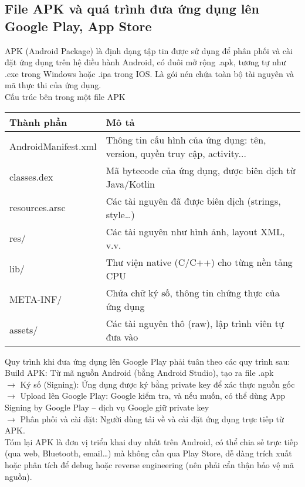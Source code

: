     \subsection{File APK và quá trình đưa ứng dụng lên Google Play, App Store}
    \renewcommand{\labelitemi}{--}
    \begin{flushleft}
        \hspace*{0.8cm}APK (Android Package) là định dạng tập tin được sử dụng để phân phối và cài đặt ứng dụng trên hệ điều hành Android, có đuôi mở rộng .apk, tương tự như .exe trong Windows hoặc .ipa trong IOS. Là gói nén chứa toàn bộ tài nguyên và mã thực thi của ứng dụng.\\
        Cấu trúc bên trong một file APK
        \begin{center}
            \renewcommand{\arraystretch}{1.5}
            \begin{tabular}{|l|p{11cm}|}
            \hline
            \textbf{Thành phần} & \textbf{Mô tả} \\
            \hline
            AndroidManifest.xml & Thông tin cấu hình của ứng dụng: tên, version, quyền truy cập, activity... \\
            \hline
            classes.dex & Mã bytecode của ứng dụng, được biên dịch từ Java/Kotlin \\
            \hline
            resources.arsc & Các tài nguyên đã được biên dịch (strings, style…) \\
            \hline
            res/ & 	Các tài nguyên như hình ảnh, layout XML, v.v. \\
            \hline
            lib/ & 	Thư viện native (C/C++) cho từng nền tảng CPU \\
            \hline
            META-INF/ & Chứa chữ ký số, thông tin chứng thực của ứng dụng \\
            \hline
            assets/ & Các tài nguyên thô (raw), lập trình viên tự đưa vào \\
            \hline
            \end{tabular}
            \end{center}
            
        \hspace*{0.8cm}Quy trình khi đưa ứng dụng lên Google Play phải tuân theo các quy trình sau:  \\
        \setlength{\parskip}{1em}\hspace*{0.6cm}Build APK: Từ mã nguồn Android (bằng Android Studio), tạo ra file .apk \\$\rightarrow$ Ký số (Signing): Ứng dụng được ký bằng private key để xác thực nguồn gốc \\$\rightarrow$ Upload lên Google Play: Google kiểm tra, và nếu muốn, có thể dùng App \hspace*{0.6cm}Signing by Google Play – dịch vụ Google giữ private key \\$\rightarrow$ Phân phối và cài đặt: Người dùng tải về và cài đặt ứng dụng trực tiếp từ APK.\\

        \hspace*{0.8cm}Tóm lại APK là đơn vị triển khai duy nhất trên Android, có thể chia sẻ trực tiếp (qua web, Bluetooth, email…) mà không cần qua Play Store, dễ dàng trích xuất hoặc phân tích để debug hoặc reverse engineering (nên phải cẩn thận bảo vệ mã nguồn).
    \end{flushleft}
